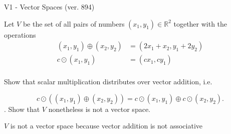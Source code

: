 \begin{exercise}
  \begin{exerciseTitle}V1 - Vector Spaces (ver. 894)\end{exerciseTitle}
  \begin{exerciseStatement}
    Let \(V\) be the set of all pairs of numbers \((x_1,y_1)\in\mathbb{R}^2\)  together with the operations 
\begin{align*}
(x_1,y_1)\oplus (x_2,y_2)&= (2x_1+x_2, y_1+2y_2)\\ 
c \odot (x_1,y_1) &= (cx_1,cy_1)\\ 
\end{align*}

	Show that scalar multiplication distributes over vector addition, i.e. 
					
\[c\odot \left((x_1,y_1)\oplus(x_2,y_2)\right)=c\odot(x_1,y_1)\oplus c\odot(x_2,y_2).\]
.
	Show that \(V\) nonetheless is not a vector space.
	


  \end{exerciseStatement}
  \begin{exerciseAnswer}
   \(V\) is not a vector space because vector addition is not associative
	
  


  \end{exerciseAnswer}
\end{exercise}